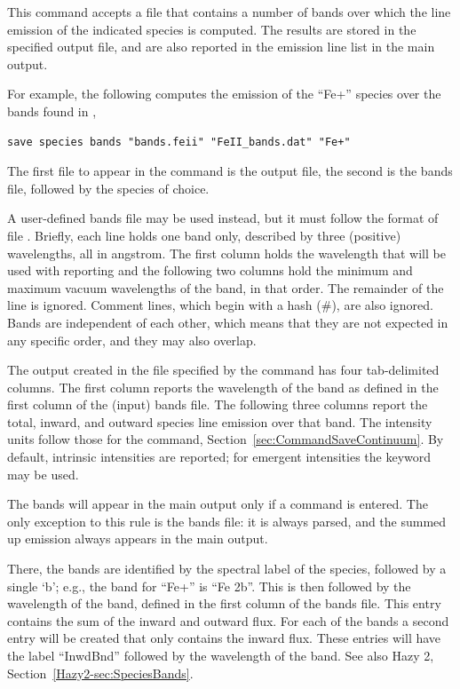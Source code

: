 \par
This command accepts a file that contains a number of bands over which the
line emission of the indicated species is computed. The results are stored
in the specified output file, and are also reported in the emission line
list in the main output.

\par
For example, the following computes the emission of the ``Fe+'' species
over the bands found in ,
%
\begin{verbatim}
save species bands "bands.feii" "FeII_bands.dat" "Fe+"
\end{verbatim}
%
The first file to appear in the command is the output file,
the second is the bands file, followed by the species of choice.

\par
A user-defined bands file may be used instead, but it must follow the
format of file .
Briefly, each line holds one band only, described by three (positive)
wavelengths, all in angstrom.
The first column holds the wavelength that will be used with reporting
and the following two columns hold the minimum and maximum vacuum wavelengths
of the band, in that order.
The remainder of the line is ignored.
Comment lines, which begin with a hash (\#), are also ignored.
Bands are independent of each other, which means that they are not
expected in any specific order, and they may also overlap.

\par
The output created in the file specified by the  command
has four tab-delimited columns.
The first column reports the wavelength of the band as defined in the
first column of the (input) bands file.
The following three columns report the total, inward, and outward
species line emission over that band.
The intensity units follow those for the  command,
Section~\ref{sec:CommandSaveContinuum}.
By default, intrinsic intensities are reported; for emergent intensities the
keyword  may be used.

\par
The bands will appear in the main output only if a  command is
entered.
The only exception to this rule is the  bands file: it is always parsed,
and the summed up emission always appears in the main output.

\par
There, the bands are identified by the spectral label of the species, followed
by a single `b'; e.g., the band for ``Fe+'' is ``Fe 2b''.
This is then followed by the wavelength of the band, defined in the
first column of the bands file.
This entry contains the sum of the inward and outward flux. For each of the
bands a second entry will be created that only contains the inward flux.
These entries will have the label ``InwdBnd'' followed by the wavelength of
the band.
See also Hazy 2, Section~\ref{Hazy2-sec:SpeciesBands}.

